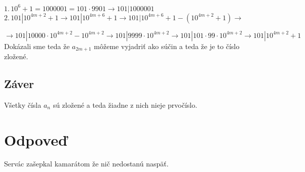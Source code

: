 \documentclass[11pt]{article}
\newtheorem{sentence}{Veta}
\begin{document}
\noindent
$ 1. \, 10^6 + 1 = 1000001 = 101 \cdot 9901 \rightarrow 101 | 1000001$ \\

\noindent
$ 2. \, 101 | 10^{4m+2}+1 \rightarrow 101 | 10^{4m+6} + 1 \rightarrow 101 | 10^{4m+6} + 1 - (10^{4m+2}+1 ) \rightarrow $

$\rightarrow 101 | 10000 \cdot 10^{4m+2} - 10^{4m+2} \rightarrow 101 | 9999 \cdot 10^{4m+2} \rightarrow 101 | 101\cdot 99\cdot 10^{4m+2} \rightarrow 101 | 10^{4m+2}+1 $ \\

Dokázali sme teda že $a_{2m+1}$ môžeme vyjadriť ako súčin a teda že je to číslo zložené.

\subsection*{Záver}
Všetky čísla $a_n$ sú zložené a teda žiadne z nich nieje prvočíslo.





    \section*{Odpoveď}
        Servác zašepkal kamarátom že nič nedostanú naspäť.
\end{document}
